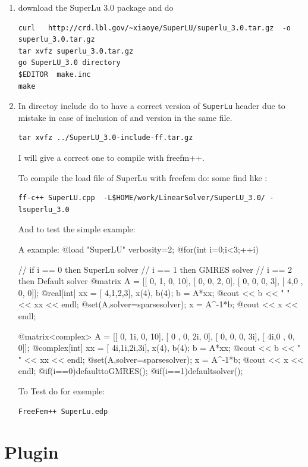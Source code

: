 \documentclass[a4paper,twoside,12pt]{book}
\begin{document}
\begin{enumerate}
\item download the SuperLu 3.0 package and do
\begin{verbatim}
curl   http://crd.lbl.gov/~xiaoye/SuperLU/superlu_3.0.tar.gz  -o superlu_3.0.tar.gz
tar xvfz superlu_3.0.tar.gz
go SuperLU_3.0 directory
$EDITOR  make.inc
make
\end{verbatim}

\item  In directoy include do
to have a correct version of \texttt{SuperLu} header due to mistake
in case of inclusion of  and  version in the same file.
\begin{verbatim}
tar xvfz ../SuperLU_3.0-include-ff.tar.gz
\end{verbatim}
I will give a correct one
to compile with freefm++.

To compile  the \freefempp load file  of SuperLu with freefem do:
some find like :
\begin{verbatim}
ff-c++ SuperLU.cpp  -L$HOME/work/LinearSolver/SuperLU_3.0/ -lsuperlu_3.0
\end{verbatim}

And to test the simple example:

A example:
\bFF
@load "SuperLU"
verbosity=2;
@for(int i=0;i<3;++i)
{
// if i == 0 then SuperLu  solver \hfilll
//    i == 1 then GMRES    solver \hfilll
//    i == 2 then Default  solver \hfilll
  {
    @matrix A =
      [[ 0, 1, 0, 10],
       [ 0,  0,  2, 0],
       [ 0, 0, 0,  3],
       [ 4,0 , 0, 0]];
    @real[int] xx = [ 4,1,2,3], x(4), b(4);
    b = A*xx;
    @cout << b << " " << xx << endl;
    @set(A,solver=sparsesolver);
    x = A^-1*b;
    @cout << x << endl;
  }

  {
    @matrix<complex> A =
      [[ 0, 1i, 0, 10],
       [ 0 ,  0,  2i, 0],
       [ 0, 0, 0,  3i],
       [ 4i,0 , 0, 0]];
    @complex[int] xx = [ 4i,1i,2i,3i], x(4), b(4);
    b = A*xx;
    @cout << b << " " << xx << endl;
    @set(A,solver=sparsesolver);
    x = A^-1*b;
    @cout << x << endl;
  }
  @if(i==0)defaulttoGMRES();
  @if(i==1)defaultsolver();
}
\eFF

To Test do for exemple:
\begin{verbatim}
FreeFem++ SuperLu.edp
\end{verbatim}


\end{enumerate}

\section{Plugin}
\end{document}
